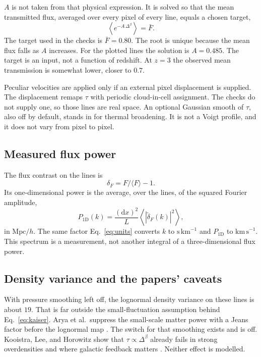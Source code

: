 \documentclass[11pt]{article}
\begin{document}
$A$ is not taken from that physical expression. It is solved so that the mean transmitted flux, averaged over every pixel of every line, equals a chosen target,
\begin{equation}
\label{eq:meanflux}
\left\langle e^{-A\,\Delta^{\beta}} \right\rangle = \bar F.
\end{equation}
The target used in the checks is $\bar F = 0.80$. The root is unique because the mean flux falls as $A$ increases. For the plotted lines the solution is $A=0.485$. The target is an input, not a function of redshift. At $z=3$ the observed mean transmission is somewhat lower, closer to $0.7$.

Peculiar velocities are applied only if an external pixel displacement is supplied. The displacement remaps $\tau$ with periodic cloud-in-cell assignment. The checks do not supply one, so those lines are real space. An optional Gaussian smooth of $\tau$, also off by default, stands in for thermal broadening. It is not a Voigt profile, and it does not vary from pixel to pixel.

\subsection{Measured flux power}

The flux contrast on the lines is
\begin{equation}
\delta_F = F/\langle F\rangle - 1.
\end{equation}
Its one-dimensional power is the average, over the lines, of the squared Fourier amplitude,
\begin{equation}
\label{eq:measure}
P_{1\mathrm{D}}(k)
=
\frac{(\mathrm{d}x)^{2}}{L}
\left\langle \left|\tilde\delta_F(k)\right|^{2} \right\rangle,
\end{equation}
in $\mathrm{Mpc}/h$. The same factor Eq.~\eqref{eq:units} converts $k$ to $\mathrm{s\,km}^{-1}$ and $P_{1\mathrm{D}}$ to $\mathrm{km\,s}^{-1}$. This spectrum is a measurement, not another integral of a three-dimensional flux power.

\subsection{Density variance and the papers' caveats}

With pressure smoothing left off, the lognormal density variance on these lines is about $19$. That is far outside the small-fluctuation assumption behind Eq.~\eqref{eq:kaiser}. Arya et al.\ suppress the small-scale matter power with a Jeans factor before the lognormal map \cite{Arya:2022uke}. The switch for that smoothing exists and is off. Kooistra, Lee, and Horowitz show that $\tau\propto\Delta^{\beta}$ already fails in strong overdensities and where galactic feedback matters \cite{Kooistra:2022hzw}. Neither effect is modelled.
\end{document}
